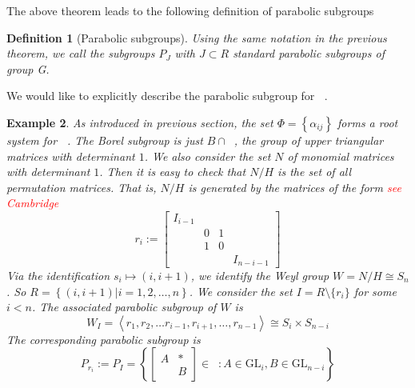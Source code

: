 \documentclass[12pt]{article} %
\newtheorem{definition}{Definition}[section]
\newtheorem{example}[definition]{Example}
\DeclareMathOperator{\SLn}{\text{SL}_n(\mathbb{R})}
\begin{document}
The above theorem leads to the following definition of parabolic subgroups
\begin{definition}[Parabolic subgroups]
    Using the same notation in the previous theorem, we call the subgroups $P_J$ with $J \subset R$  \textit{standard parabolic subgroups} of group G.
\end{definition}
We would like to explicitly describe the parabolic subgroup for $\SLn$.
\begin{example}
    As introduced in previous section, the set $\Phi = \left\lbrace \alpha_{ij}\right\rbrace $ forms a
    root system for $\SLn$. The Borel subgroup is just $B \cap \SLn$, the group of upper triangular matrices with determinant $1$.
    We also consider the set $N$ of monomial matrices  with determinant $1$. Then it is easy to check that
    $N/H$ is the set of all permutation matrices. That is, $N/H$ is generated by the
    matrices of the form \textcolor{red}{see Cambridge}
    \[r_i := \begin{bmatrix}
            I_{i-1} &   &   &           \\
                    & 0 & 1 &           \\
                    & 1 & 0 &           \\
                    &   &   & I_{n-i-1}
        \end{bmatrix}\]
    Via the identification $s_i \mapsto (i,i+1)$, we identify  the Weyl group $W = N/H \cong S_n$. So
    $R = \left\lbrace (i,i+1)| i = 1,2,\ldots,n\right\rbrace $. We consider the set
    $I = R \setminus \{r_i\}$ for some $i<n$. The associated parabolic subgroup of
    $W$ is
    \[W_I = \left\langle r_1,r_2,\ldots r_{i-1},r_{i+1},\ldots, r_{n-1} \right\rangle \cong
        S_i \times S_{n-i}\]
    The corresponding parabolic subgroup is
    \[P_{r_i} := P_I = \left\lbrace \begin{bmatrix}
            A & \ast \\
              & B
        \end{bmatrix} \in \SLn: A \in \text{GL}_i, B \in \text{GL}_{n-i}\right\rbrace \]
\end{example}
\end{document}
